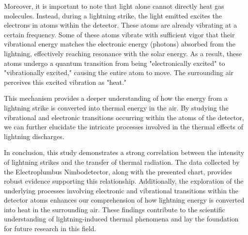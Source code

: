 \documentclass[english]{cenarticle}
\begin{document}
Moreover, it is important to note that light alone cannot directly heat gas molecules. Instead, during a lightning strike, the light emitted excites the electrons in atoms within the detector. These atoms are already vibrating at a certain frequency. Some of these atoms vibrate with sufficient vigor that their vibrational energy matches the electronic energy (photons) absorbed from the lightning, effectively reaching resonance with the solar energy. As a result, these atoms undergo a quantum transition from being "electronically excited" to "vibrationally excited," causing the entire atom to move. The surrounding air perceives this excited vibration as "heat."

This mechanism provides a deeper understanding of how the energy from a lightning strike is converted into thermal energy in the air. By studying the vibrational and electronic transitions occurring within the atoms of the detector, we can further elucidate the intricate processes involved in the thermal effects of lightning discharges.

In conclusion, this study demonstrates a strong correlation between the intensity of lightning strikes and the transfer of thermal radiation. The data collected by the Electroplumbus Nimbodetector, along with the presented chart, provides robust evidence supporting this relationship. Additionally, the exploration of the underlying processes involving electronic and vibrational transitions within the detector atoms enhances our comprehension of how lightning energy is converted into heat in the surrounding air. These findings contribute to the scientific understanding of lightning-induced thermal phenomena and lay the foundation for future research in this field.




  
  {\setlength{\parindent}{0pt}
    
  }
\end{document}
